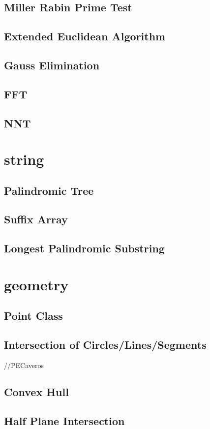 \documentclass[10pt,twocolumn,oneside]{article}
\begin{document}
\subsection{Miller Rabin Prime Test}

\subsection{Extended Euclidean Algorithm}

\subsection{Gauss Elimination}

\subsection{FFT}

\subsection{NNT}


\section{string}
\subsection{Palindromic Tree}

\subsection{Suffix Array}

\subsection{Longest Palindromic Substring}


\section{geometry}
\subsection{Point Class}

\subsection{Intersection of Circles/Lines/Segments}
//PECaveros




\subsection{Convex Hull}

\subsection{Half Plane Intersection}

\end{document}
